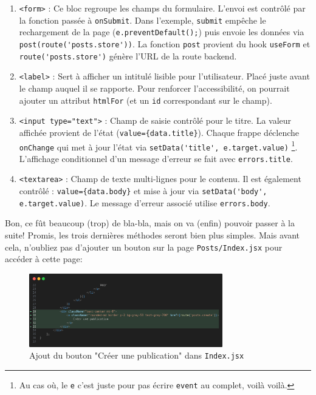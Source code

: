 \begin{enumerate}
    \item \verb|<form>| : Ce bloc regroupe les champs du formulaire. L'envoi est contrôlé par la fonction passée à \verb|onSubmit|. Dans l'exemple, \verb|submit| empêche le rechargement de la page (\verb|e.preventDefault();|) puis envoie les données via \verb|post(route('posts.store'))|. La fonction \verb|post| provient du hook \verb|useForm| et \verb|route('posts.store')| génère l'URL de la route backend.
    
    \item \verb|<label>| : Sert à afficher un intitulé lisible pour l'utilisateur. Placé juste avant le champ auquel il se rapporte. Pour renforcer l'accessibilité, on pourrait ajouter un attribut \verb|htmlFor| (et un \verb|id| correspondant sur le champ).
    
    \item \verb|<input type="text">| : Champ de saisie contrôlé pour le titre. La valeur affichée provient de l'état (\verb|value={data.title}|). Chaque frappe déclenche \verb|onChange| qui met à jour l'état via \verb|setData('title', e.target.value)| \footnote{Au cas où, le \texttt{e} c'est juste pour pas écrire \texttt{event} au complet, voilà voilà.}. L'affichage conditionnel d'un message d'erreur se fait avec \verb|errors.title|.
    
    \item \verb|<textarea>| : Champ de texte multi-lignes pour le contenu. Il est également contrôlé : \verb|value={data.body}| et mise à jour via \verb|setData('body', e.target.value)|. Le message d'erreur associé utilise \verb|errors.body|.
\end{enumerate}

Bon, ce fût beaucoup (trop) de bla-bla, mais on va (enfin) pouvoir passer à la suite! Promis, les trois dernières méthodes seront bien plus simples. Mais avant cela, n'oubliez pas d'ajouter un bouton sur la page \texttt{Posts/Index.jsx} pour accéder à cette page:

\begin{figure}[!h]
    \centering
    \includegraphics[width=0.75\textwidth]{figures-C1/posts_index_add_create.png}
    \caption{Ajout du bouton "Créer une publication" dans \texttt{Index.jsx }}
\end{figure}

